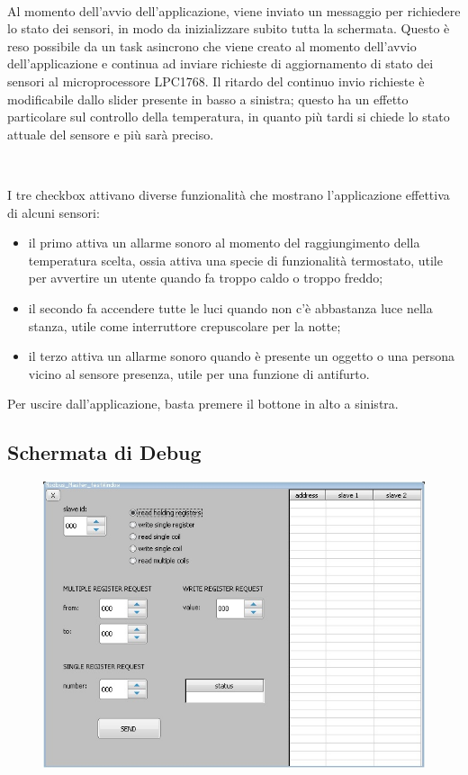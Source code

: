 \documentclass[a4paper,titlepage]{book}
\newcommand{\itema}{\begin{itemize}[noitemsep,topsep=10pt,parsep=5pt,partopsep=10pt]}
\begin{document}
~

Al momento dell'avvio dell'applicazione, viene inviato un messaggio per richiedere lo stato dei sensori, in modo da inizializzare subito tutta la schermata. Questo è reso possibile da un task asincrono che viene creato al momento dell'avvio dell'applicazione e continua ad inviare richieste di aggiornamento di stato dei sensori al microprocessore LPC1768. Il ritardo del continuo invio richieste è modificabile dallo slider presente in basso a sinistra; questo ha un effetto particolare sul controllo della temperatura, in quanto più tardi si chiede lo stato attuale del sensore e più sarà preciso.

~

I tre checkbox attivano diverse funzionalità che mostrano l'applicazione effettiva di alcuni sensori:

\itema

\item il primo attiva un allarme sonoro al momento del raggiungimento della temperatura scelta, ossia attiva una specie di funzionalità termostato, utile per avvertire un utente quando fa troppo caldo o troppo freddo;

\item il secondo fa accendere tutte le luci quando non c'è abbastanza luce nella stanza, utile come interruttore crepuscolare per la notte;

\item il terzo attiva un allarme sonoro quando è presente un oggetto o una persona vicino al sensore presenza, utile per una funzione di antifurto.

\end{itemize}

Per uscire dall'applicazione, basta premere il bottone in alto a sinistra.

\newpage
\subsection{Schermata di Debug}

\begin{figure}[!ht]
\centering
\includegraphics[scale=0.6]{debug.jpg}
\end{figure}
\end{document}

